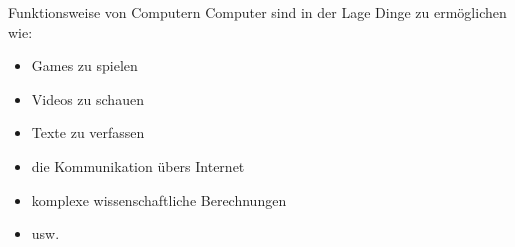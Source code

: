 \begin{frame}[fragile]{Funktionsweise von Computern}
	Computer sind in der Lage Dinge zu ermöglichen wie:
	\begin{itemize}
		\item Games zu spielen
		\item Videos zu schauen
		\item Texte zu verfassen
		\item die Kommunikation übers Internet
		\item komplexe wissenschaftliche Berechnungen
		\item usw.
	\end{itemize}
\end{frame}

